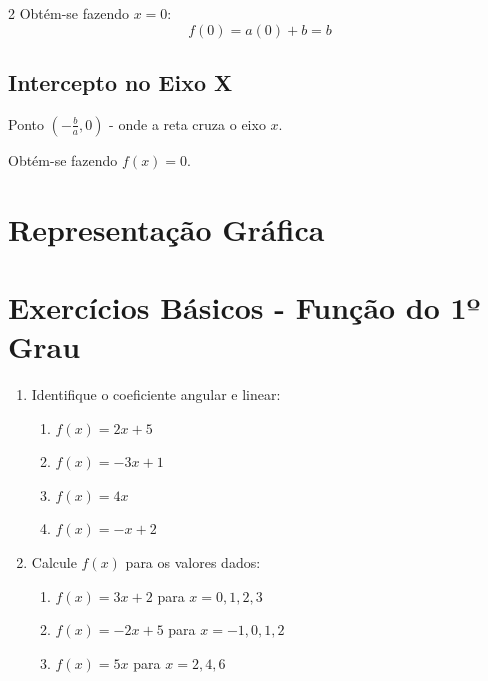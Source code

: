 \documentclass[11pt]{article}
\begin{document}
\begin{multicols}{2}
Obtém-se fazendo $x = 0$:
\[
f(0) = a(0) + b = b
\]

\subsection*{Intercepto no Eixo X}
Ponto $\left(-\frac{b}{a}, 0\right)$ - onde a reta cruza o eixo $x$.

Obtém-se fazendo $f(x) = 0$.

\section*{Representação Gráfica}

\begin{center}
\end{center}

\section*{Exercícios Básicos - Função do 1º Grau}

\begin{enumerate}[leftmargin=*]

\item Identifique o coeficiente angular e linear:
\begin{enumerate}[label=\alph*)]
\item $f(x) = 2x + 5$
\item $f(x) = -3x + 1$
\item $f(x) = 4x$
\item $f(x) = -x + 2$
\end{enumerate}

\item Calcule $f(x)$ para os valores dados:
\begin{enumerate}[label=\alph*)]
\item $f(x) = 3x + 2$ para $x = 0, 1, 2, 3$
\item $f(x) = -2x + 5$ para $x = -1, 0, 1, 2$
\item $f(x) = 5x$ para $x = 2, 4, 6$
\end{enumerate}


\end{enumerate}
\end{multicols}
\end{document}
